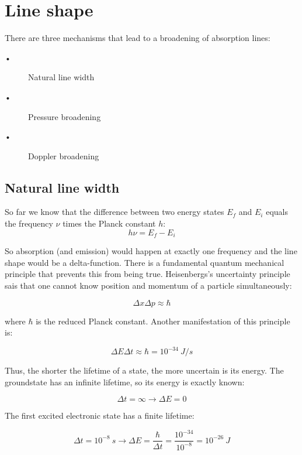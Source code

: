 \section{Line shape}
\label{sec:line_shape}

There are three mechanisms that lead to a broadening of absorption lines:
\begin{description}
\item[•] Natural line width
\item[•] Pressure broadening
\item[•] Doppler broadening 
\end{description}

\subsection{Natural line width}

So far we know that the difference between two energy states $E_{f}$ and $E_{i}$ equals the frequency $\nu$ times the Planck constant $h$:
\begin{equation}
h \nu = E_f - E_i
\end{equation}

So absorption (and emission) would happen at exactly one frequency and the line shape would be a delta-function. There is a fundamental quantum mechanical principle that prevents this from being true. Heisenbergs's uncertainty principle sais that one cannot know position and momentum of a particle simultaneously: 

\begin{equation}
\Delta x \Delta p \approx \hbar
\end{equation}

where $\hbar$ is the reduced Planck constant. Another manifestation of this principle is:

\begin{equation}
\Delta E \Delta t \approx \hbar = 10^{-34}~J/s
\end{equation}

Thus, the shorter the lifetime of a state, the more uncertain is its energy. 
The groundstate has an infinite lifetime, so its energy is exactly known:

\begin{equation}
\Delta t = \infty \rightarrow \Delta E = 0
\end{equation}

The first excited electronic state has a finite lifetime:

\begin{equation}
\Delta t = 10^{-8}~s \rightarrow \Delta E = \frac{\hbar}{\Delta t} = \frac{10^{-34}}{10^{-8}} = 10^{-26}~J
\end{equation}

